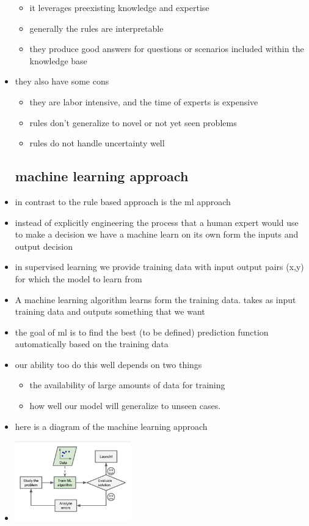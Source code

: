 \documentclass{article}
\begin{document}
\begin{itemize}
\begin{itemize}
    \item it leverages preexisting knowledge and expertise
    \item  generally the rules are interpretable 
\item they produce good answers for questions or scenarios included within the knowledge base
\end{itemize}
\item they also have some cons 
\begin{itemize}
    \item they are labor intensive, and the time of experts is expensive
    \item rules don't generalize to novel or not yet seen problems 
    \item rules do not handle uncertainty well
\end{itemize}
\subsection{machine learning approach}
\item in contrast to the rule based approach is the ml approach 
\item instead of explicitly engineering the process that a human expert would use to make a decision we have a machine learn on its own form the inputs and output decision
\item in supervised learning we provide training data with input output pairs (x,y) for which the model to learn from 
\item A machine learning algorithm learns form the training data. takes as input training data and outputs something that we want 
\item the goal of ml is to find the best (to be defined) prediction function automatically based on the training data 
\item our ability too do this well depends on two things 
\begin{itemize}
    \item the availability of large amounts of data for training
    \item how well our model will generalize to unseen cases. 
\end{itemize}
\item here is a diagram of the machine learning approach \item \includegraphics[width=5cm]{lecture_notes/lecture_1/mla.jpg}

\end{itemize}
\end{document}
